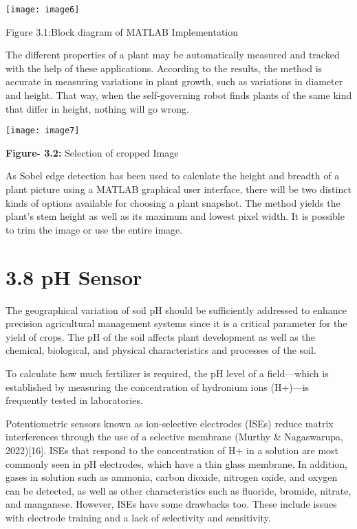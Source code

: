 \documentclass{book} %
\begin{document}
\noindent 

\noindent \texttt{[image: image6]}

\noindent Figure 3.1:Block diagram of MATLAB Implementation

\noindent 

\noindent 

\noindent The different properties of a plant may be automatically measured and tracked with the help of these applications. According to the results, the method is accurate in measuring variations in plant growth, such as variations in diameter and height. That way, when the self-governing robot finds plants of the same kind that differ in height, nothing will go wrong.

\noindent 

\noindent          \texttt{[image: image7]}

\textbf{Figure- 3.2:} Selection of cropped Image

\noindent 

\noindent As Sobel edge detection has been used to calculate the height and breadth of a plant picture using a MATLAB graphical user interface, there will be two distinct kinds of options available for choosing a plant snapshot. The method yields the plant's stem height as well as its maximum and lowest pixel width. It is possible to trim the image or use the entire image. 

\noindent 

\noindent 
\section{3.8 pH Sensor}

\noindent The geographical variation of soil pH should be sufficiently addressed to enhance precision agricultural management systems since it is a critical parameter for the yield of crops. The pH of the soil affects plant development as well as the chemical, biological, and physical characteristics and processes of the soil.

\noindent To calculate how much fertilizer is required, the pH level of a field---which is established by measuring the concentration of hydronium ions (H+)---is frequently tested in laboratories.

\noindent 

\noindent Potentiometric sensors known as ion-selective electrodes (ISEs) reduce matrix interferences through the use of a selective membrane (Murthy \& Nagaswarupa, 2022)[16]. ISEs that respond to the concentration of H+ in a solution are most commonly seen in pH electrodes, which have a thin glass membrane. In addition, gases in solution such as ammonia, carbon dioxide, nitrogen oxide, and oxygen can be detected, as well as other characteristics such as fluoride, bromide, nitrate, and manganese. However, ISEs have some drawbacks too. These include issues with electrode training and a lack of selectivity and sensitivity.
\end{document}

